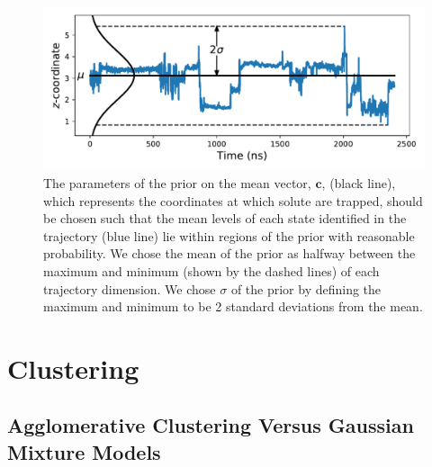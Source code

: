 \documentclass{article}
\begin{document}
  \begin{figure}[h]
  \centering
  \includegraphics[width=\textwidth]{prior_guesses.pdf}
  \caption{The parameters of the prior on the mean vector, $\mathbf{c}$, (black line), which
  represents the coordinates at which solute are trapped, should be chosen such
  that the mean levels of each state identified in the trajectory (blue line) lie within
  regions of the prior with reasonable probability. We chose the mean of the prior 
  as halfway between the maximum and minimum (shown by the dashed lines) of each trajectory dimension. We chose 
  $\sigma$ of the prior by defining the maximum and minimum to be 2 standard deviations
  from the mean.}\label{fig:prior_guesses}
  \end{figure}
  
  \pagebreak
  
  \section{Clustering}\label{section:clustering}
  
  \subsection{Agglomerative Clustering Versus Gaussian Mixture Models}\label{section:agglomerative}
  
  
\end{document}
